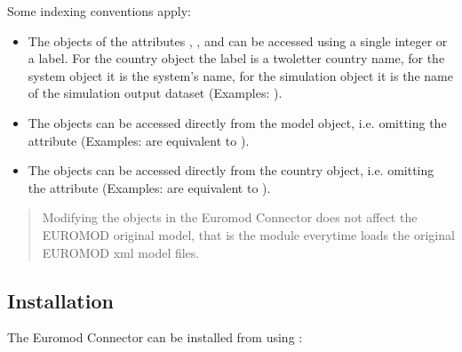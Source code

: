 \documentclass[letterpaper,10pt,english]{sphinxmanual}
\begin{document}
\sphinxAtStartPar
Some indexing conventions apply:
\begin{itemize}
\item {} 
\sphinxAtStartPar
The objects of the attributes , , and  can be accessed using a single integer or a label. For the country object the label is a two\sphinxhyphen{}letter country name, for the system object it is the system’s name, for the simulation object it is the name of the simulation output dataset (Examples: ).

\item {} 
\sphinxAtStartPar
The  objects can be accessed directly from the model object, i.e. omitting the attribute  (Examples:  are equivalent to ).

\item {} 
\sphinxAtStartPar
The  objects can be accessed directly from the country object, i.e. omitting the attribute  (Examples:  are equivalent to ).

\end{itemize}
\begin{quote}

\sphinxAtStartPar
{} Modifying the objects in the Euromod Connector does not affect the EUROMOD original model, that is the  module everytime loads the original EUROMOD xml model files.
\end{quote}


\subsection{Installation}
\label{\detokenize{userguide:installation}}
\sphinxAtStartPar
The Euromod Connector can be installed from   using :
\end{document}
